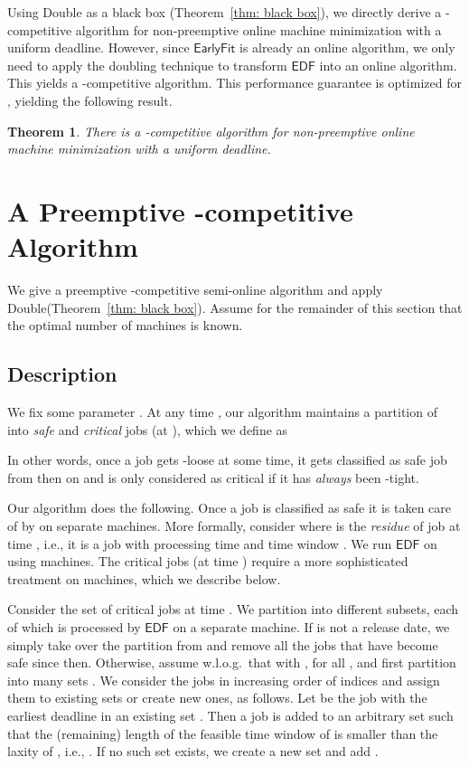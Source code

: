 \documentclass[letterpaper,11pt]{article}
\newtheorem{theorem}{Theorem}
\newcommand{\EDF}{\ensuremath{\mathsf{EDF}}\xspace}
\newcommand{\Earlyfit}{\ensuremath{\mathsf{EarlyFit}}\xspace}
\newcommand{\double}{{\sf Double}\xspace}
\begin{document}
Using \double as a black box (Theorem~\ref{thm: black box}), we directly derive a -competitive algorithm for non-preemptive online machine minimization with a uniform deadline. However, since \Earlyfit is already an online algorithm, we only need to apply the doubling technique to transform \EDF into an online algorithm. This yields a -competitive algorithm. This performance guarantee is optimized for , yielding the following result.

\begin{theorem}
  There is a -competitive algorithm for non-preemptive online machine minimization with a uniform deadline.
\end{theorem}

\section{A Preemptive  -competitive Algorithm}
\label{sec:general logn}

We give a preemptive -competitive semi-online
algorithm and apply \double (Theorem~\ref{thm: black box}). Assume for
the remainder of this section that the optimal number of machines is known.

\subsection{Description}

We fix some parameter . At any time , our algorithm maintains a partition of  into  {\em safe} and {\em critical} jobs (at ), which we define as

In other words, once a job gets -loose at some time, it gets classified as safe job from then on and is only considered as critical if it has {\em always} been -tight.

Our algorithm does the following. Once a job is classified as safe it is taken care of by  on separate machines. More formally, consider  where  is the {\em residue} of job  at time , i.e., it is a job with processing time  and  time window . We run \EDF on  using  machines. The critical jobs (at time ) require a more sophisticated treatment on  machines, which we describe below. 

Consider the set of critical jobs  at time . We partition  into  different subsets, each of which is processed by \EDF on a separate machine. If  is not a release date, we simply take over the partition from  and remove all the jobs that have become safe since then. Otherwise, assume w.l.o.g.~that  with , for all , and first partition  into  many sets . We consider the jobs in increasing order of indices and assign them to existing sets or create new ones, as follows. Let  be the job with the earliest deadline in an existing set . Then a job  is added to an arbitrary set  such that the (remaining) length of the feasible time window of  is smaller than the laxity of , i.e., . If no such set exists, we create a new set and add .
\end{document}
